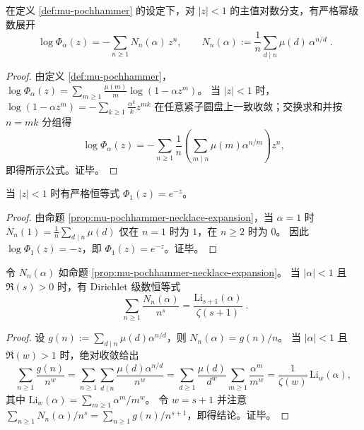 \begin{proposition}\label{prop:mu-pochhammer-necklace-expansion}
在定义 \ref{def:mu-pochhammer} 的设定下，对 \(|z|<1\) 的主值对数分支，有严格幂级数展开
\[
\boxed{\;
\log\Phi_\alpha(z)
=-\sum_{n\ge 1}N_n(\alpha)\,z^n,
\qquad
N_n(\alpha):=\frac{1}{n}\sum_{d\mid n}\mu(d)\,\alpha^{n/d}\; }.
\]
\end{proposition}

\begin{proof}
由定义 \ref{def:mu-pochhammer}，
\(
\log\Phi_\alpha(z)=\sum_{m\ge 1}\frac{\mu(m)}{m}\log(1-\alpha z^m)
\)。
当 \(|z|<1\) 时，
\(
\log(1-\alpha z^m)=-\sum_{k\ge 1}\frac{\alpha^k}{k}z^{mk}
\)
在任意紧子圆盘上一致收敛；交换求和并按 \(n=mk\) 分组得
\[
\log\Phi_\alpha(z)
=-\sum_{n\ge 1}\frac{1}{n}\left(\sum_{m\mid n}\mu(m)\alpha^{n/m}\right)z^n,
\]
即得所示公式。证毕。
\end{proof}

\begin{corollary}[\texorpdfstring{$\Phi_1(z)=e^{-z}$}{Phi1=e(-z)} 的退化律]\label{cor:mu-pochhammer-phi1-exp-minus-z}
当 \(|z|<1\) 时有严格恒等式 \(\Phi_1(z)=e^{-z}\)。
\end{corollary}

\begin{proof}
由命题 \ref{prop:mu-pochhammer-necklace-expansion}，当 \(\alpha=1\) 时
\(
N_n(1)=\frac{1}{n}\sum_{d\mid n}\mu(d)
\)
仅在 \(n=1\) 时为 \(1\)，在 \(n\ge 2\) 时为 \(0\)。
因此 \(\log\Phi_1(z)=-z\)，即 \(\Phi_1(z)=e^{-z}\)。证毕。
\end{proof}

\begin{proposition}\label{prop:mu-pochhammer-necklace-dirichlet-polylog}
令 \(N_n(\alpha)\) 如命题 \ref{prop:mu-pochhammer-necklace-expansion}。
当 \(|\alpha|<1\) 且 \(\Re(s)>0\) 时，有 Dirichlet 级数恒等式
\[
\boxed{\;
\sum_{n\ge 1}\frac{N_n(\alpha)}{n^s}
=\frac{\mathrm{Li}_{s+1}(\alpha)}{\zeta(s+1)}\; }.
\]
\end{proposition}

\begin{proof}
设 \(g(n):=\sum_{d\mid n}\mu(d)\alpha^{n/d}\)，则 \(N_n(\alpha)=g(n)/n\)。
当 \(|\alpha|<1\) 且 \(\Re(w)>1\) 时，绝对收敛给出
\[
\sum_{n\ge 1}\frac{g(n)}{n^w}
=\sum_{n\ge 1}\sum_{d\mid n}\frac{\mu(d)\alpha^{n/d}}{n^w}
=\sum_{d\ge 1}\frac{\mu(d)}{d^w}\sum_{m\ge 1}\frac{\alpha^m}{m^w}
=\frac{1}{\zeta(w)}\,\mathrm{Li}_{w}(\alpha),
\]
其中 \(\mathrm{Li}_{w}(\alpha)=\sum_{m\ge 1}\alpha^m/m^w\)。
令 \(w=s+1\) 并注意
\(
\sum_{n\ge 1}N_n(\alpha)/n^s=\sum_{n\ge 1}g(n)/n^{s+1}
\)，即得结论。证毕。
\end{proof}

